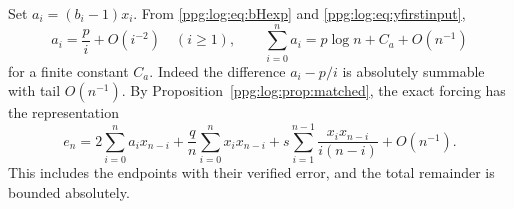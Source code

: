 \documentclass[11pt,letterpaper]{article}
\theoremstyle{remark}\newtheorem{remark}[theorem]{Remark}
\numberwithin{equation}{section}
\begin{document}
Set $a_i=(b_i-1)x_i$. From \eqref{ppg:log:eq:bHexp} and \eqref{ppg:log:eq:yfirstinput},
\begin{equation}\label{ppg:log:eq:ai}
 a_i=\frac p i+O(i^{-2})\quad(i\ge1),\qquad
 \sum_{i=0}^na_i=p\log n+C_a+O(n^{-1})
\end{equation}
for a finite constant $C_a$. Indeed the difference $a_i-p/i$ is absolutely summable with tail $O(n^{-1})$.
By Proposition~\ref{ppg:log:prop:matched}, the exact forcing has the representation
\begin{equation}\label{ppg:log:eq:eforcingmatched}
 e_n=2\sum_{i=0}^na_ix_{n-i}
       +\frac q n\sum_{i=0}^nx_ix_{n-i}
       +s\sum_{i=1}^{n-1}\frac{x_ix_{n-i}}{i(n-i)}+O(n^{-1}).
\end{equation}
This includes the endpoints with their verified error, and the total remainder is bounded absolutely.
\end{document}
